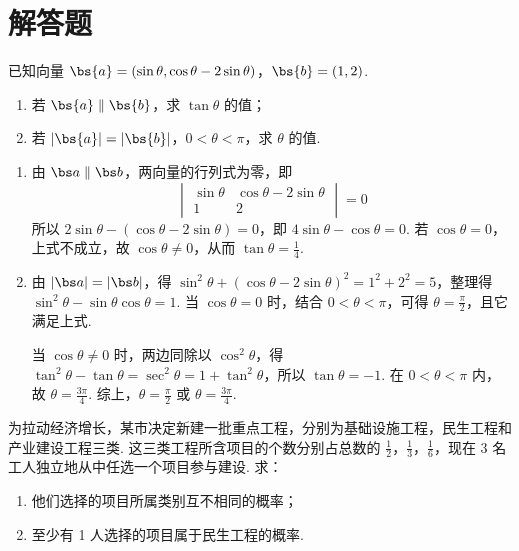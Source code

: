 \section{解答题}

\begin{problem}
已知向量 \(\bs{a} = (\sin \theta, \cos \theta - 2\sin \theta)\)，\(\bs{b} = (1, 2)\).
\begin{enumerate}
\item 若 \(\bs{a} \parallel \bs{b}\)，求 \(\tan \theta\) 的值；
\item 若 \(|\bs{a}| = |\bs{b}|\)，\(0 < \theta < \pi\)，求 \(\theta\) 的值.
\end{enumerate}
\end{problem}

\begin{solution}
\begin{enumerate}
\item 由 \(\bs a\parallel\bs b\)，两向量的行列式为零，即
\[
\begin{vmatrix}
\sin\theta & \cos\theta-2\sin\theta\\
1 & 2
\end{vmatrix}=0
\]
所以 \(2\sin\theta-(\cos\theta-2\sin\theta)=0\)，即 \(4\sin\theta-\cos\theta=0\). 若 \(\cos\theta=0\)，上式不成立，故 \(\cos\theta\ne0\)，从而 \(\tan\theta=\frac{1}{4}\).

\item 由 \(|\bs a|=|\bs b|\)，得 \(\sin^2\theta+(\cos\theta-2\sin\theta)^2=1^2+2^2=5\)，整理得 \(\sin^2\theta-\sin\theta\cos\theta=1\).
当 \(\cos\theta=0\) 时，结合 \(0<\theta<\pi\)，可得 \(\theta=\frac{\pi}{2}\)，且它满足上式.

当 \(\cos\theta\ne0\) 时，两边同除以 \(\cos^2\theta\)，得 \(\tan^2\theta-\tan\theta=\sec^2\theta=1+\tan^2\theta\)，所以 \(\tan\theta=-1\). 在 \(0<\theta<\pi\) 内，故 \(\theta=\frac{3\pi}{4}\). 综上，\(\theta=\frac{\pi}{2}\) 或 \(\theta=\frac{3\pi}{4}\).
\end{enumerate}
\end{solution}

\begin{problem}
为拉动经济增长，某市决定新建一批重点工程，分别为基础设施工程，民生工程和产业建设工程三类. 这三类工程所含项目的个数分别占总数的 \(\frac{1}{2}\)，\(\frac{1}{3}\)，\(\frac{1}{6}\)，现在 3 名工人独立地从中任选一个项目参与建设. 求：
\begin{enumerate}
\item 他们选择的项目所属类别互不相同的概率；
\item 至少有 1 人选择的项目属于民生工程的概率.
\end{enumerate}
\end{problem}

